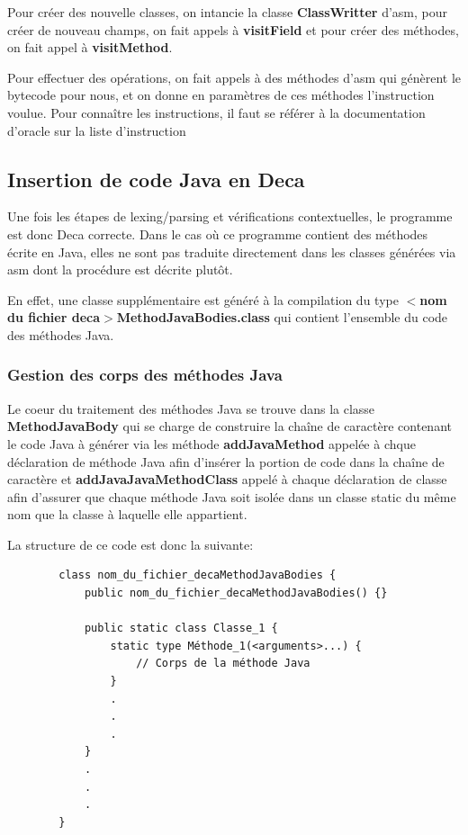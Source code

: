 \documentclass[12pt, a4paper, one side]{article}
\begin{document}
    Pour créer des nouvelle classes, on intancie la classe \textbf{ClassWritter}
    d'asm, pour créer de nouveau champs, on fait appels à \textbf{visitField} et
    pour créer des méthodes, on fait appel à \textbf{visitMethod}.

    Pour effectuer des opérations, on fait appels à des méthodes d'asm qui
    génèrent le bytecode pour nous, et on donne en paramètres de ces méthodes
    l'instruction voulue. Pour connaître les instructions, il faut se référer
    à la documentation d'oracle sur la liste d'instruction \cite{ref_inst_java}

    \subsection{Insertion de code Java en Deca}
    Une fois les étapes de lexing/parsing et vérifications contextuelles, le programme est donc Deca correcte. Dans le cas où ce programme contient des méthodes écrite en Java, elles ne sont pas traduite directement dans les classes générées via asm dont la procédure est décrite plutôt.

    En effet, une classe supplémentaire est généré à la compilation du type \textbf{$<$nom du fichier deca$>$MethodJavaBodies.class} qui contient l'ensemble du code des méthodes Java.

    \subsubsection{Gestion des corps des méthodes Java}
    Le coeur du traitement des méthodes Java se trouve dans la classe \textbf{MethodJavaBody} qui se charge de construire la chaîne de caractère contenant le code Java à générer via les méthode \textbf{addJavaMethod} appelée à chque déclaration de méthode Java afin d'insérer la portion de code dans la chaîne de caractère et \textbf{addJavaJavaMethodClass} appelé à chaque déclaration de classe afin d'assurer que chaque méthode Java soit isolée dans un classe static du même nom que la classe à laquelle elle appartient.

    La structure de ce code est donc la suivante:

    \begin{verbatim}
        class nom_du_fichier_decaMethodJavaBodies {
            public nom_du_fichier_decaMethodJavaBodies() {}

            public static class Classe_1 {
                static type Méthode_1(<arguments>...) {
                    // Corps de la méthode Java
                }
                .
                .
                .
            }
            .
            .
            .
        }
    \end{verbatim}
\end{document}
